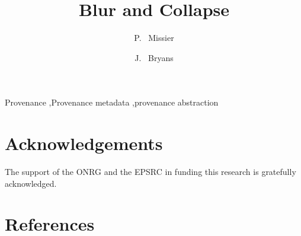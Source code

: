 \documentclass{elsarticle}
\begin{document}
\title{Blur and Collapse}


\author[ncl]{P. ~Missier }

\author[cov]{J. ~Bryans}


\address[ncl]{School of Computing Science, Newcastle University, UK}
\address[cov]{Institute for Future Transport and Cities, Coventry University, UK}




\begin{abstract}

\end{abstract}

\begin{keyword}
Provenance \sep Provenance metadata \sep provenance abstraction 
\end{keyword}

\maketitle


\section*{Acknowledgements}

The support of the ONRG and the EPSRC in funding this research is gratefully acknowledged. 

\section*{References}

%
%

\end{document}
